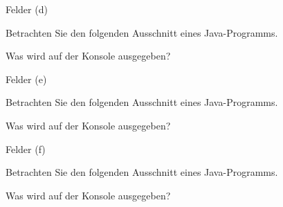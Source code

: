 \begin{frame}[t]%
  \setcounter{exercise}{22} %
  \medskip
  \begin{exercise}{Felder (d)}
  \begin{body}
  Betrachten Sie den folgenden Ausschnitt eines Java-Programms.
  
  \begin{parts}
  \item Was wird auf der Konsole ausgegeben?
  \pause
  \item \code{[0, 0, 3, 3, 3]}
  \end{parts}
  \end{body}
  \end{exercise}
\end{frame}

\begin{frame}[t]%
  \setcounter{exercise}{22} %
  \medskip
  \begin{exercise}{Felder (e)}
  \begin{body}
  Betrachten Sie den folgenden Ausschnitt eines Java-Programms.
  
  \begin{parts}
  \item Was wird auf der Konsole ausgegeben?
  \pause
  \item \code{[1, 4, 9, 16, 25]}
  \end{parts}
  \end{body}
  \end{exercise}
\end{frame}

\begin{frame}[t]%
\setcounter{exercise}{22} %
  \medskip
  \begin{exercise}{Felder (f)}
  \begin{body}
  Betrachten Sie den folgenden Ausschnitt eines Java-Programms.
  
  \begin{parts}
  \item Was wird auf der Konsole ausgegeben?
  \pause
  \item \code{[5, 4, 3, 2, 1]}
  \end{parts}
  \end{body}
  \end{exercise}
\end{frame}
